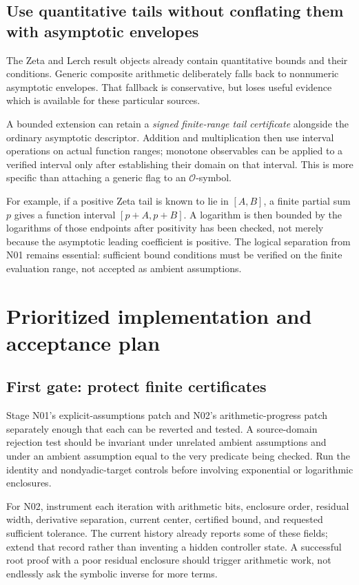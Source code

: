 \documentclass[11pt,a4paper]{article}
\newcommand{\code}[1]{\texttt{\detokenize{#1}}}
\newcommand{\OO}{\mathcal O}
\begin{document}
\subsection{Use quantitative tails without conflating them with asymptotic envelopes}
The Zeta and Lerch result objects already contain quantitative bounds and their conditions. Generic composite arithmetic deliberately falls back to nonnumeric asymptotic envelopes. That fallback is conservative, but loses useful evidence which is available for these particular sources.\cite{dirichlet,envelope}

A bounded extension can retain a \emph{signed finite-range tail certificate} alongside the ordinary asymptotic descriptor. Addition and multiplication then use interval operations on actual function ranges; monotone observables can be applied to a verified interval only after establishing their domain on that interval. This is more specific than attaching a generic \code{Certified -> True} flag to an \(\OO\)-symbol.

For example, if a positive Zeta tail is known to lie in \([A,B]\), a finite partial sum \(p\) gives a function interval \([p+A,p+B]\). A logarithm is then bounded by the logarithms of those endpoints after positivity has been checked, not merely because the asymptotic leading coefficient is positive. The logical separation from N01 remains essential: sufficient bound conditions must be verified on the finite evaluation range, not accepted as ambient assumptions.

\section{Prioritized implementation and acceptance plan}

\subsection{First gate: protect finite certificates}
Stage N01's explicit-assumptions patch and N02's arithmetic-progress patch separately enough that each can be reverted and tested. A source-domain rejection test should be invariant under unrelated ambient assumptions and under an ambient assumption equal to the very predicate being checked. Run the identity and nondyadic-target controls before involving exponential or logarithmic enclosures.

For N02, instrument each iteration with arithmetic bits, enclosure order, residual width, derivative separation, current center, certified bound, and requested sufficient tolerance. The current history already reports some of these fields; extend that record rather than inventing a hidden controller state. A successful root proof with a poor residual enclosure should trigger arithmetic work, not endlessly ask the symbolic inverse for more terms.\cite{cert}
\end{document}
